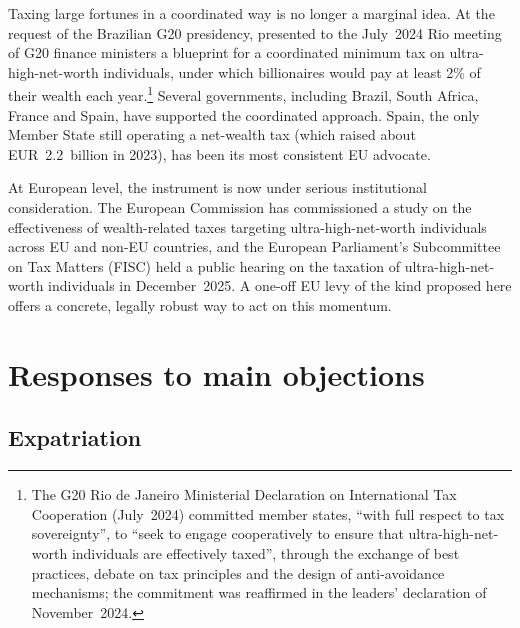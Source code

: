 \documentclass[../../main]{subfiles}
\begin{document}
Taxing large fortunes in a coordinated way is no longer a marginal idea. At the request of the Brazilian G20 presidency, \citet{Zucman2024} presented to the July~2024 Rio meeting of G20 finance ministers a blueprint for a coordinated minimum tax on ultra-high-net-worth individuals, under which billionaires would pay at least 2\% of their wealth each year.\footnote{The G20 Rio de Janeiro Ministerial Declaration on International Tax Cooperation (July~2024) committed member states, ``with full respect to tax sovereignty'', to ``seek to engage cooperatively to ensure that ultra-high-net-worth individuals are effectively taxed'', through the exchange of best practices, debate on tax principles and the design of anti-avoidance mechanisms; the commitment was reaffirmed in the leaders' declaration of November~2024.} Several governments, including Brazil, South Africa, France and Spain, have supported the coordinated approach. Spain, the only Member State still operating a net-wealth tax (which raised about EUR~2.2~billion in 2023), has been its most consistent EU advocate.

At European level, the instrument is now under serious institutional consideration. The European Commission has commissioned a study on the effectiveness of wealth-related taxes targeting ultra-high-net-worth individuals across EU and non-EU countries, and the European Parliament's Subcommittee on Tax Matters (FISC) held a public hearing on the taxation of ultra-high-net-worth individuals in December~2025. %
A one-off EU levy of the kind proposed here offers a concrete, legally robust way to act on this momentum.

\section{Responses to main objections}
\label{sec:objections}

\subsection{Expatriation}
\end{document}

